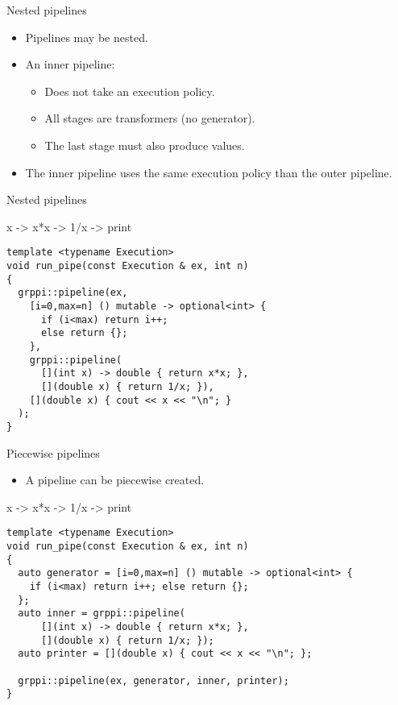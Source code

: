 \begin{frame}[t,fragile]{Nested pipelines}
\begin{itemize}
  \item Pipelines may be nested.
  \vfill
  \item An inner pipeline:
    \begin{itemize}
      \item Does not take an execution policy.
      \item All stages are transformers (no generator).
      \item The last stage must also produce values.
    \end{itemize}
  \vfill
  \item The inner pipeline uses the same execution policy than the outer
        pipeline.
\end{itemize}
\end{frame}

\begin{frame}[t,fragile]{Nested pipelines}
\begin{block}{x -> x*x -> 1/x -> print}
\begin{lstlisting}
template <typename Execution>
void run_pipe(const Execution & ex, int n)
{
  grppi::pipeline(ex,
    [i=0,max=n] () mutable -> optional<int> {
      if (i<max) return i++;
      else return {};
    },
    grppi::pipeline(
      [](int x) -> double { return x*x; },
      [](double x) { return 1/x; }),
    [](double x) { cout << x << "\n"; }
  );
}
\end{lstlisting}
\end{block}
\end{frame}

\begin{frame}[t,fragile]{Piecewise pipelines}
\begin{itemize}
  \item A pipeline can be piecewise created.
\end{itemize}
\begin{block}{x -> x*x -> 1/x -> print}
\begin{lstlisting}
template <typename Execution>
void run_pipe(const Execution & ex, int n)
{
  auto generator = [i=0,max=n] () mutable -> optional<int> {
    if (i<max) return i++; else return {};
  };
  auto inner = grppi::pipeline(
      [](int x) -> double { return x*x; },
      [](double x) { return 1/x; });
  auto printer = [](double x) { cout << x << "\n"; };

  grppi::pipeline(ex, generator, inner, printer);
}
\end{lstlisting}
\end{block}
\end{frame}

